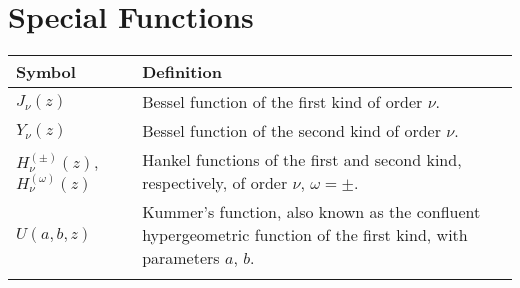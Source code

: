 \section*{Special Functions}
\begin{tabularx}{\textwidth}{lX}
  \hline\hline
  Symbol			& Definition	\\
  \hline\hline
  $J_\nu(z)$		& Bessel function of the first kind of order $\nu$.	\\
  $Y_\nu(z)$		& Bessel function of the second kind of order $\nu$.	\\
  $H_\nu^{(\pm)}(z)$, %
  $H_\nu^{(\omega)}(z)$& Hankel functions of the first and second kind, respectively, of order $\nu$, $\omega=\pm$.\\
  $U(a,b,z)$		& Kummer's function, also known as the confluent hypergeometric function of the first kind, with parameters $a$, $b$. \\
  \hline\hline				\\
\end{tabularx}

